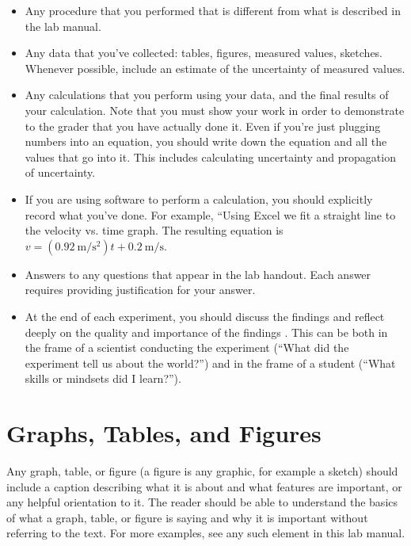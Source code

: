 	\begin{itemize}
		\item Any procedure that you performed that is different from what is described in the lab manual.
		
		\item Any data that you've collected: tables, figures, measured values, sketches. Whenever possible, include an estimate of the uncertainty of measured values.
		
		\item Any calculations that you perform using your data, and the final results of your calculation. Note that you must show your work in order to demonstrate to the grader that you have actually done it. Even if you're just plugging numbers into an equation, you should write down the equation and all the values that go into it. This includes calculating uncertainty and propagation of uncertainty.
		
		\item If you are using software to perform a calculation, you should explicitly record what you've done. For example, ``Using Excel we fit a straight line to the velocity vs. time graph. The resulting equation is $v = (0.92\:\mathrm{m/s^2}) t + 0.2\:\mathrm{m/s}$.
		
		\item Answers to any questions that appear in the lab handout. Each answer requires providing justification for your answer.
		
		\item At the end of each experiment, you should discuss the findings and reflect deeply on the quality and importance of the findings%
		. This can be both in the frame of a scientist conducting the experiment (``What did the experiment tell us about the world?'') and in the frame of a student (``What skills or mindsets did I learn?'').
	\end{itemize}

\section{Graphs, Tables, and Figures}

Any graph, table, or figure (a figure is any graphic, for example a sketch) should include a caption describing what it is about and what features are important, or any helpful orientation to it. The reader should be able to understand the basics of what a graph, table, or figure is saying and why it is important without referring to the text. For more examples, see any such element in this lab manual.

